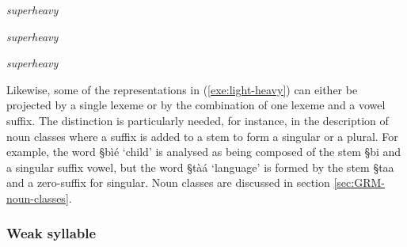 \begin{exe}
\ex\label{exe:superheavy}
\begin{multicols}{3}
\begin{xlist}

\ex\label{ex:sup-heavy1}{\it superheavy}\\
{}



\ex\label{ex:sup-heavy2}{\it superheavy}\\
{}



\ex\label{ex:sup-heavy3}{\it superheavy}\\
{}

\end{xlist}
\end{multicols}
\end{exe}

Likewise,  some of the representations in (\ref{exe:light-heavy}) can
either be
projected by a single lexeme or by the combination of  one lexeme and a vowel
suffix.
The distinction is particularly needed, for instance,  in the description of
noun classes where a suffix is added to a stem to form a singular or a plural.
For example,  the word {\S bìé} `child' is analysed as being composed of the
stem {\S bi}    and a singular suffix vowel, but the word {\S tàá}  
`language' is  formed by the stem {\S taa}  and a  zero-suffix for
singular.   Noun classes are discussed in section \ref{sec:GRM-noun-classes}. 

 


\subsubsection{Weak syllable}
\label{sec:PHO-weak-syll}

